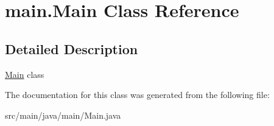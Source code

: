 \hypertarget{classmain_1_1_main}{}\section{main.\+Main Class Reference}
\label{classmain_1_1_main}


\subsection{Detailed Description}
\hyperlink{classmain_1_1_main}{Main} class 

The documentation for this class was generated from the following file\+:\begin{DoxyCompactItemize}
\item 
src/main/java/main/Main.\+java\end{DoxyCompactItemize}
